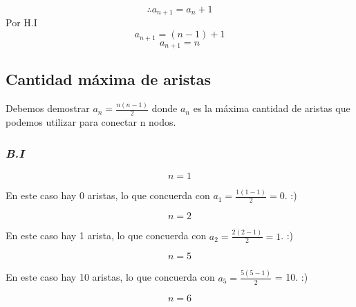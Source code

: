\documentclass[../doc.tex]{subfiles}
\begin{document}
\[\therefore a_{n+1} = a_{n} + 1\]
Por H.I
\[a_{n+1} = (n - 1) + 1\]
\[a_{n+1} = n\]
 

\subsection{Cantidad máxima de aristas}
Debemos demostrar $a_n = \frac{n(n-1)}{2} $ donde $a_n$ es la máxima cantidad de 
aristas que podemos utilizar para conectar n nodos.

\subsubsection*{\emph{B.I}}
\[ n = 1 \]

\begin{center}
\end{center}
En este caso hay 0 aristas, lo que concuerda con $a_1 = \frac{1(1-1)}{2} = 0$. :)

\[ n = 2 \]

\begin{center}
\end{center}
En este caso hay 1 arista, lo que concuerda con $a_2 = \frac{2(2-1)}{2} = 1$. :)


\[ n = 5 \]

\begin{center}
\end{center}
En este caso hay 10 aristas, lo que concuerda con $a_5 = \frac{5(5-1)}{2}$ = 10. :)

\[ n = 6 \]
\end{document}
